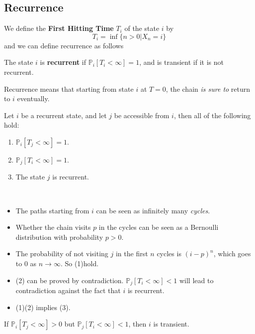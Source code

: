     \subsection{Recurrence}
    We define the \textbf{First Hitting Time} $T_i$ of the state $i$ by
    \[ T_i = \inf\{n>0 | X_n = i\} \]
    and we can define recurrence as follows
    \begin{definition}[Recurrence]
        The state $i$ is \textbf{recurrent} if $\mathbb{P}_i[T_i<\infty] = 1$, and is transient if it is not recurrent.
    \end{definition}
    \begin{remark}
        Recurrence means that starting from state $i$ at $T=0$, the chain \emph{is sure to} return to $i$ eventually.
    \end{remark}
    \begin{theorem}
        \normalfont
        Let $i$ be a recurrent state, and let $j$ be accessible from $i$, then all of the following hold:
        \begin{enumerate}
            \item $\mathbb{P}_i[T_j < \infty] = 1$.
            \item $\mathbb{P}_j[T_i < \infty] = 1$.
            \item The state $j$ is recurrent.
        \end{enumerate}
    \end{theorem}
    \begin{sketchproof}
        ~{}
        \begin{itemize}
            \item The paths starting from $i$ can be seen as infinitely many \emph{cycles}.
            \item Whether the chain visits $p$ in the cycles can be seen as a Bernoulli distribution with probability $p>0$.
            \item The probability of not visiting $j$ in the first $n$ cycles is $(i-p)^n$, which goes to $0$ as $n\to\infty$. So (1)hold.
            \item (2) can be proved by contradiction. $\mathbb{P}_j[T_i < \infty] < 1$ will lead to contradiction against the fact that $i$ is recurrent.
            \item (1)(2) implies (3).
        \end{itemize}
    \end{sketchproof}
    \begin{corollary}
        If $\mathbb{P}_i[T_j < \infty] > 0$ but $\mathbb{P}_j[T_i < \infty] < 1$, then $i$ is transient.
    \end{corollary}
